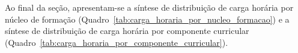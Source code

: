 % 


Ao final da seção, apresentam-se a síntese de distribuição de carga horária por núcleo de formação (Quadro~\ref{tab:carga_horaria_por_nucleo_formacao}) e a síntese de distribuição de carga horária por componente curricular (Quadro~\ref{tab:carga_horaria_por_componente_curricular}).



